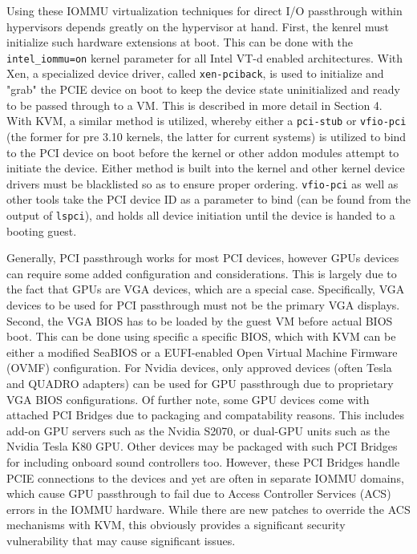 Using these IOMMU virtualization techniques for direct I/O passthrough within hypervisors depends greatly on the hypervisor at hand.  First, the kenrel must initialize such hardware extensions at boot. This can be done with the \verb|intel_iommu=on| kernel parameter for all Intel VT-d enabled architectures.  With Xen, a specialized device driver, called \verb|xen-pciback|, is used to initialize and "grab" the PCIE device on boot to keep the device state uninitialized and ready to be passed through to a VM. This is described in more detail in Section 4. With KVM, a similar method is utilized, whereby either a \verb|pci-stub| or \verb|vfio-pci| (the former for pre 3.10 kernels, the latter for current systems) is utilized to bind to the PCI device on boot before the kernel or other addon modules attempt to initiate the device.  Either method is built into the kernel and other kernel device drivers must be blacklisted so as to ensure proper ordering. \verb|vfio-pci| as well as other tools take the PCI device ID as a parameter to bind (can be found from the output of \verb|lspci|), and holds all device initiation until the device is handed to a booting guest.  

Generally, PCI passthrough works for most PCI devices, however GPUs devices can require some added configuration and considerations.  This is largely due to the fact that GPUs are VGA devices, which are a special case. Specifically, VGA devices to be used for PCI passthrough must not be the primary VGA displays. Second, the VGA BIOS has to be loaded by the guest VM before actual BIOS boot.  This can be done using specific a specific BIOS, which with KVM can be either a modified SeaBIOS or a EUFI-enabled Open Virtual Machine Firmware (OVMF) configuration.  For Nvidia devices, only approved devices (often Tesla and QUADRO adapters) can be used for GPU passthrough due to proprietary VGA BIOS configurations. Of further note, some GPU devices come with attached PCI Bridges due to packaging and compatability reasons. This includes add-on GPU servers such as the Nvidia S2070, or dual-GPU units such as the Nvidia Tesla K80 GPU. Other devices may be packaged with such PCI Bridges for including onboard sound controllers too. However, these PCI Bridges handle PCIE connections to the devices and yet are often in separate IOMMU domains, which cause GPU passthrough to fail due to Access Controller Services (ACS) errors in the IOMMU hardware. While there are new patches to override the ACS mechanisms with KVM, this obviously provides a significant security vulnerability that may cause significant issues. 



